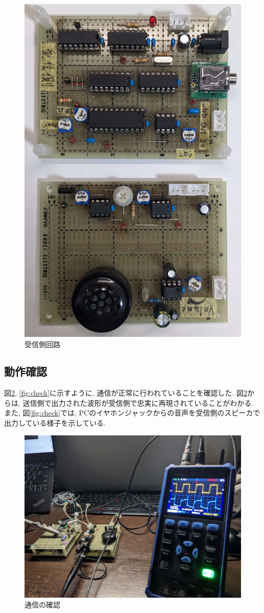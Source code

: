 \documentclass[a4paper,10pt]{article}
\begin{document}
\begin{multicols}{2}[\raggedcolumns]
\begin{figure}[H]
    \centering
    \includegraphics[width=0.8\linewidth]{figure/jusin.jpg} 
    \caption{受信側回路} 
    \label{fig:jusin}
\end{figure}
\subsection{動作確認}
図\ref{fig:test}, \ref{fig:check}に示すように, 通信が正常に行われていることを確認した.  
図\ref{fig:test}からは, 送信側で出力された波形が受信側で忠実に再現されていることがわかる.  
また, 図\ref{fig:check}では, PCのイヤホンジャックからの音声を受信側のスピーカで出力している様子を示している.  

\begin{figure}[H]
    \centering
    \includegraphics[width=0.7\linewidth]{figure/test.jpg} 
    \caption{通信の確認} 
    \label{fig:test}
\end{figure}


\end{multicols}
\end{document}
